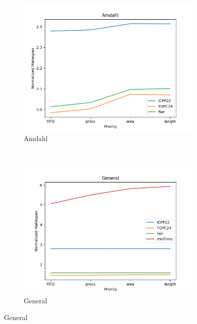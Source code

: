 \documentclass{article}
\begin{document}
\begin{figure}[htbp]
\begin{subfigure}[b]{0.32\textwidth}\includegraphics[width=\textwidth]{Results/Priority/Priority_Amdahl}\caption{Amdahl}\label{fig:lines_figures_Priority_Amdahl}\end{subfigure}
\\[2ex]
\begin{subfigure}[b]{0.32\textwidth}\includegraphics[width=\textwidth]{Results/Priority/Priority_General}\caption{General}\label{fig:lines_figures_Priority_General}\end{subfigure}
\hfill

\end{figure}
\end{document}
